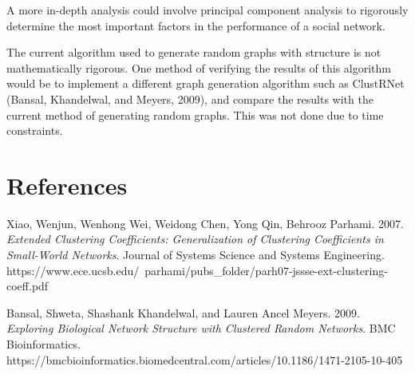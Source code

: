 \documentclass{article}
\begin{document}
A more in-depth analysis could involve principal component analysis to rigorously
determine the most important factors in the performance of a social network.

The current algorithm used to generate random graphs with structure is not mathematically rigorous.
One method of verifying the results of this algorithm would be to implement a different
graph generation algorithm such as ClustRNet (Bansal, Khandelwal, and Meyers, 2009),
and compare the results with the current method of generating random graphs.
This was not done due to time constraints.

\section{References}
Xiao, Wenjun, Wenhong Wei, Weidong Chen, Yong Qin, Behrooz Parhami. 2007.
\textit{Extended Clustering Coefficients: Generalization of Clustering Coefficients in Small-World
Networks}. Journal of Systems Science and Systems Engineering. https://www.ece.ucsb.edu/~parhami/pubs_folder/parh07-jssse-ext-clustering-coeff.pdf

Bansal, Shweta, Shashank Khandelwal, and Lauren Ancel Meyers. 2009. \textit{Exploring Biological Network Structure with Clustered Random Networks}.
BMC Bioinformatics. https://bmcbioinformatics.biomedcentral.com/articles/10.1186/1471-2105-10-405
\end{document}

